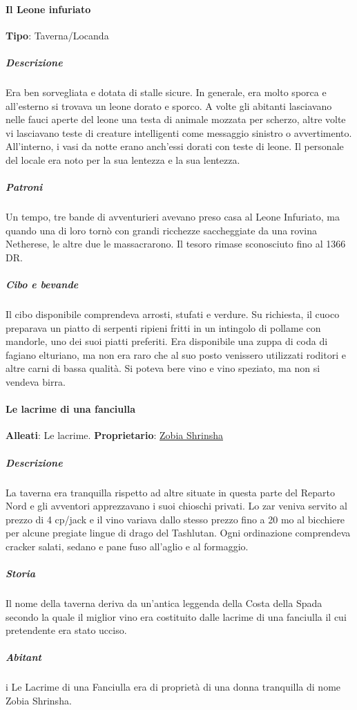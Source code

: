 \documentclass{article}
\begin{document}
\paragraph{Il Leone infuriato}
\textbf{Tipo}: Taverna/Locanda
\subparagraph{Descrizione}
Era ben sorvegliata e dotata di stalle sicure. In generale, era molto sporca e all'esterno si trovava un leone dorato e sporco. A volte gli abitanti lasciavano nelle fauci aperte del leone una testa di animale mozzata per scherzo, altre volte vi lasciavano teste di creature intelligenti come messaggio sinistro o avvertimento. All'interno, i vasi da notte erano anch'essi dorati con teste di leone. Il personale del locale era noto per la sua lentezza e la sua lentezza.

\subparagraph{Patroni}
Un tempo, tre bande di avventurieri avevano preso casa al Leone Infuriato, ma quando una di loro tornò con grandi ricchezze saccheggiate da una rovina Netherese, le altre due le massacrarono. Il tesoro rimase sconosciuto fino al 1366 DR.

\subparagraph{Cibo e bevande}
Il cibo disponibile comprendeva arrosti, stufati e verdure. Su richiesta, il cuoco preparava un piatto di serpenti ripieni fritti in un intingolo di pollame con mandorle, uno dei suoi piatti preferiti. Era disponibile una zuppa di coda di fagiano elturiano, ma non era raro che al suo posto venissero utilizzati roditori e altre carni di bassa qualità. Si poteva bere vino e vino speziato, ma non si vendeva birra.
\paragraph{Le lacrime di una fanciulla}
\textbf{Alleati}: Le lacrime.
\textbf{Proprietario}: \hyperlink{https://forgottenrealms.fandom.com/wiki/Zobia_Shrinsha}{Zobia Shrinsha}
\subparagraph{Descrizione}
La taverna era tranquilla rispetto ad altre situate in questa parte del Reparto Nord e gli avventori apprezzavano i suoi chioschi privati. Lo zar veniva servito al prezzo di 4 cp/jack e il vino variava dallo stesso prezzo fino a 20  mo al bicchiere per alcune pregiate lingue di drago del Tashlutan. Ogni ordinazione comprendeva cracker salati, sedano e pane fuso all'aglio e al formaggio.

\subparagraph{Storia}
Il nome della taverna deriva da un'antica leggenda della Costa della Spada secondo la quale il miglior vino era costituito dalle lacrime di una fanciulla il cui pretendente era stato ucciso.

\subparagraph{Abitant}i
Le Lacrime di una Fanciulla era di proprietà di una donna tranquilla di nome Zobia Shrinsha.
\end{document}
